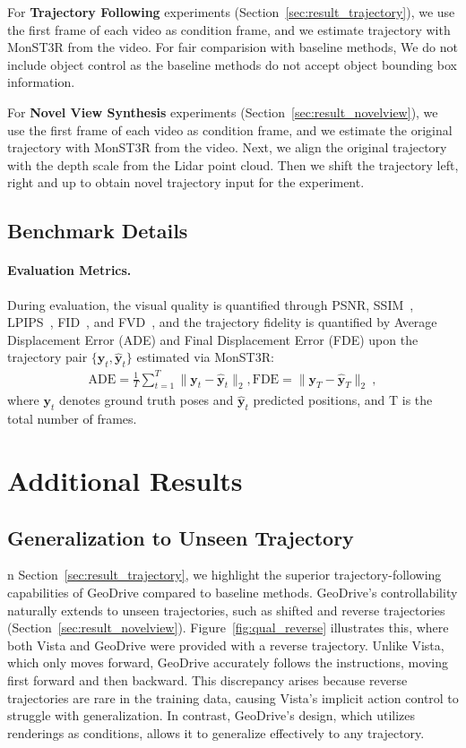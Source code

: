 \documentclass{article}
\begin{document}
For \textbf{Trajectory Following} experiments (Section~\ref{sec:result_trajectory}), we use the first frame of each video as condition frame, and we estimate trajectory with MonST3R from the video. For fair comparision with baseline methods, We do not include object control as the baseline methods do not accept object bounding box information.

For \textbf{Novel View Synthesis} experiments (Section~\ref{sec:result_novelview}), we use the first frame of each video as condition frame, and we estimate the original trajectory with MonST3R from the video. Next, we align the original trajectory with the depth scale from the Lidar point cloud. Then we shift the trajectory left, right and up to obtain novel trajectory input for the experiment.

\subsection{Benchmark Details}

\paragraph{Evaluation Metrics.} During evaluation, the visual quality is quantified through PSNR, SSIM~\cite{wang2004image}, LPIPS~\cite{Johnson2016Perceptual}, FID~\cite{heusel2017gans}, and FVD~\cite{unterthiner18}, and the trajectory fidelity is quantified by Average Displacement Error (ADE) and Final Displacement Error (FDE) upon the trajectory pair $\{\mathbf{y}_t, \hat{\mathbf{y}}_t\}$ estimated via MonST3R:
\begin{align}
\text{ADE} = \frac{1}{T} \sum_{t=1}^{T} \| \mathbf{y}_t - \hat{\mathbf{y}}_t \|_2 , \text{FDE} = \| \mathbf{y}_T - \hat{\mathbf{y}}_T \|_2 ~,
\end{align}
where $\mathbf{y}_t$ denotes ground truth poses and $\hat{\mathbf{y}}_t$ predicted positions, and T is the total
number of frames. 

\section{Additional Results}
\label{sec:append_results}

\subsection{Generalization to Unseen Trajectory}
n Section~\ref{sec:result_trajectory}, we highlight the superior trajectory-following capabilities of GeoDrive compared to baseline methods. GeoDrive's controllability naturally extends to unseen trajectories, such as shifted and reverse trajectories (Section~\ref{sec:result_novelview}). Figure~\ref{fig:qual_reverse} illustrates this, where both Vista and GeoDrive were provided with a reverse trajectory. Unlike Vista, which only moves forward, GeoDrive accurately follows the instructions, moving first forward and then backward. This discrepancy arises because reverse trajectories are rare in the training data, causing Vista's implicit action control to struggle with generalization. In contrast, GeoDrive's design, which utilizes renderings as conditions, allows it to generalize effectively to any trajectory.
\end{document}
